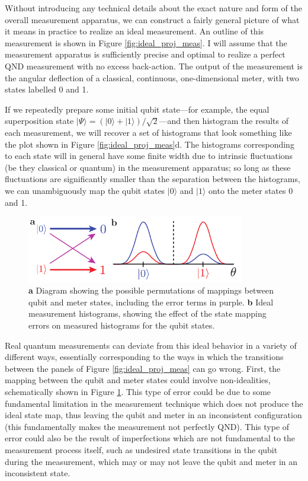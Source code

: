 Without introducing any technical details about the exact nature and form of the overall measurement apparatus, we can construct a fairly general picture of what it means in practice to realize an ideal measurement.  An outline of this measurement is shown in Figure \ref{fig:ideal_proj_meas}.  I will assume that the measurement apparatus is sufficiently precise and optimal to realize a perfect QND measurement with no excess back-action.  The output of the measurement is the angular deflection of a classical, continuous, one-dimensional meter, with two states labelled 0 and 1.

If we repeatedly prepare some initial qubit state---for example, the equal superposition state $|\Psi\rangle = (|0\rangle + |1\rangle)/\sqrt{2}$---and then histogram the results of each measurement, we will recover a set of histograms that look something like the plot shown in Figure \ref{fig:ideal_proj_meas}d.  The histograms corresponding to each state will in general have some finite width due to intrinsic fluctuations (be they classical or quantum) in the measurement apparatus; so long as these fluctuations are significantly smaller than the separation between the histograms, we can unambiguously map the qubit states $|0\rangle$ and $|1\rangle$ onto the meter states 0 and 1.

\begin{figure}
\begin{center}
	\includegraphics[width = 3.75in]{qmeas_chapter/proj_state_map}
\end{center}
\caption[Projective measurement error due to state mapping]{\textbf{a} Diagram showing the possible permutations of mappings between qubit and meter states, including the error terms in purple. \textbf{b} Ideal measurement histograms, showing the effect of the state mapping errors on measured histograms for the qubit states.}
\label{fig:proj_state_map}
\end{figure}


Real quantum measurements can deviate from this ideal behavior in a variety of different ways, essentially corresponding to the ways in which the transitions between the panels of Figure \ref{fig:ideal_proj_meas} can go wrong.  First, the mapping between the qubit and meter states could involve non-idealities, schematically shown in Figure \ref{fig:proj_state_map}.  This type of error could be due to some fundamental limitation in the measurement technique which does not produce the ideal state map, thus leaving the qubit and meter in an inconsistent configuration (this fundamentally makes the measurement not perfectly QND).  This type of error could also be the result of imperfections which are not fundamental to the measurement process itself, such as undesired state transitions in the qubit during the measurement, which may or may not leave the qubit and meter in an inconsistent state.

